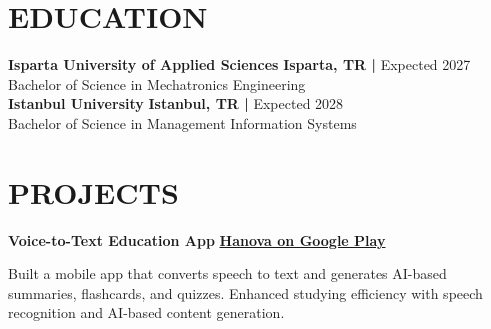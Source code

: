 \documentclass[11pt]{article}       %
\begin{document}

\vspace{-10pt}

\section*{EDUCATION}
\textbf{Isparta University of Applied Sciences} \hfill \textbf{Isparta, TR |} Expected 2027 \\
Bachelor of Science in Mechatronics Engineering \\[6pt]

\textbf{Istanbul University} \hfill \textbf{Istanbul, TR |} Expected 2028 \\
Bachelor of Science in Management Information Systems





\vspace{-6.5pt}


\section*{PROJECTS}

\textbf{Voice-to-Text Education App} \hfill 
\href{https://play.google.com/store/apps/dev?id=8414973691889516106}{\textbf{Hanova on Google Play}} \\[3pt]
\begin{minipage}{0.75\textwidth}
Built a mobile app that converts speech to text and generates AI-based summaries, flashcards, and quizzes. 
Enhanced studying efficiency with speech recognition and AI-based content generation.
\end{minipage} \\[6pt]
\end{document}
